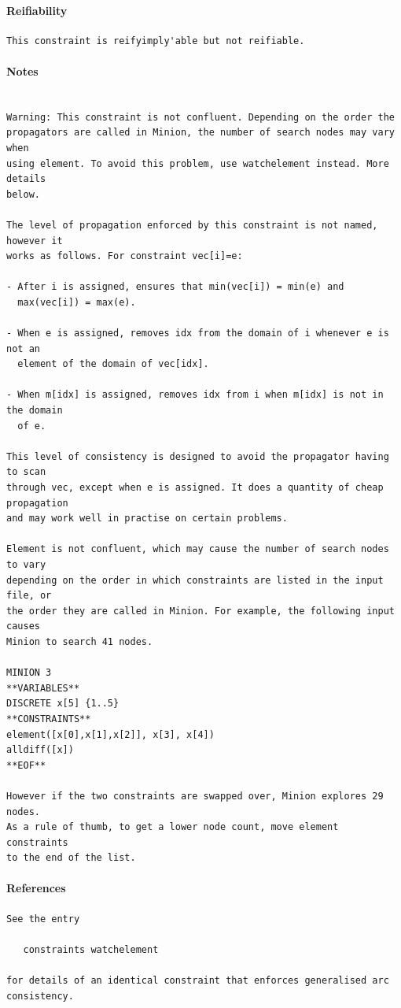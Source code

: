 \documentclass[oneside]{book}
\begin{document}
\paragraph{Reifiability}
{\footnotesize
\begin{verbatim}
This constraint is reifyimply'able but not reifiable.
\end{verbatim}
}
\paragraph{Notes}
{\footnotesize
\begin{verbatim}

Warning: This constraint is not confluent. Depending on the order the
propagators are called in Minion, the number of search nodes may vary when
using element. To avoid this problem, use watchelement instead. More details
below.

The level of propagation enforced by this constraint is not named, however it
works as follows. For constraint vec[i]=e:

- After i is assigned, ensures that min(vec[i]) = min(e) and 
  max(vec[i]) = max(e).

- When e is assigned, removes idx from the domain of i whenever e is not an
  element of the domain of vec[idx].

- When m[idx] is assigned, removes idx from i when m[idx] is not in the domain
  of e.

This level of consistency is designed to avoid the propagator having to scan
through vec, except when e is assigned. It does a quantity of cheap propagation
and may work well in practise on certain problems.

Element is not confluent, which may cause the number of search nodes to vary
depending on the order in which constraints are listed in the input file, or 
the order they are called in Minion. For example, the following input causes
Minion to search 41 nodes.

MINION 3
**VARIABLES**
DISCRETE x[5] {1..5}
**CONSTRAINTS**
element([x[0],x[1],x[2]], x[3], x[4])
alldiff([x])
**EOF**

However if the two constraints are swapped over, Minion explores 29 nodes.
As a rule of thumb, to get a lower node count, move element constraints
to the end of the list.
\end{verbatim}
}
\paragraph{References}
{\footnotesize
\begin{verbatim}
See the entry 

   constraints watchelement

for details of an identical constraint that enforces generalised arc
consistency.
\end{verbatim}
}
\end{document}
